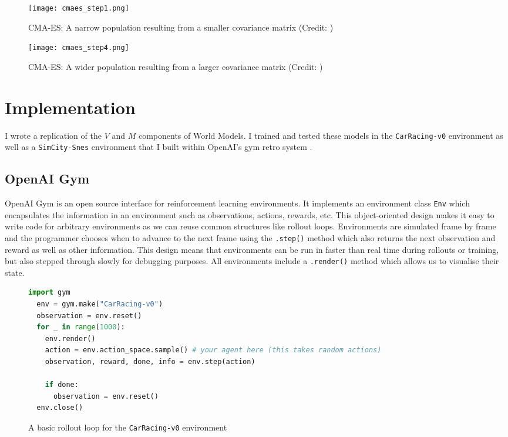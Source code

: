 \documentclass{article}
\numberwithin{figure}{section}
\theoremstyle{definition}
\begin{document}
\begin{figure}[h]
  \centering
  \begin{minipage}{0.4\textwidth}
      \centering
      \texttt{[image: cmaes\_step1.png]} %
      \caption{CMA-ES: A narrow population resulting from a smaller covariance matrix (Credit: \cite{ha2017visual}) }
  \end{minipage}\hfill
  \begin{minipage}{0.4\textwidth}
      \centering
      \texttt{[image: cmaes\_step4.png]} %
      \caption{CMA-ES: A wider population resulting from a larger covariance matrix (Credit: \cite{ha2017visual})} 
  \end{minipage}
\end{figure}




\section{Implementation}
I wrote a replication of the $V$ and $M$ components of World Models.
I trained and tested these models in the \texttt{CarRacing-v0} environment as well as a \texttt{SimCity-Snes} environment that I built within OpenAI's gym retro system \citep{nichol2018retro}.

\subsection{OpenAI Gym}
OpenAI Gym \citep{gym} is an open source interface for reinforcement learning environments.
It implements an environment class \texttt{Env} which encapsulates the information in an environment such as observations, actions, rewards, etc.
This object-oriented design makes it easy to write code for arbitrary environments as we can reuse common structures like rollout loops.
Environments are simulated frame by frame and the programmer chooses when to advance to the next frame using the \texttt{.step()} method which also returns the next observation and reward as well as other information.
This design means that environments can be run in faster than real time during rollouts or training, but also stepped through slowly for debugging purposes.
All environments include a \texttt{.render()} method which allows us to visualise their state.

\lstset{style=pystyle}
\begin{figure}[h]
\begin{lstlisting}[language=Python]
  import gym
  env = gym.make("CarRacing-v0")
  observation = env.reset()
  for _ in range(1000):
    env.render()
    action = env.action_space.sample() # your agent here (this takes random actions)
    observation, reward, done, info = env.step(action)
  
    if done:
      observation = env.reset()
  env.close()
\end{lstlisting}
\caption{A basic rollout loop for the \texttt{CarRacing-v0} environment}
\end{figure}
\end{document}
